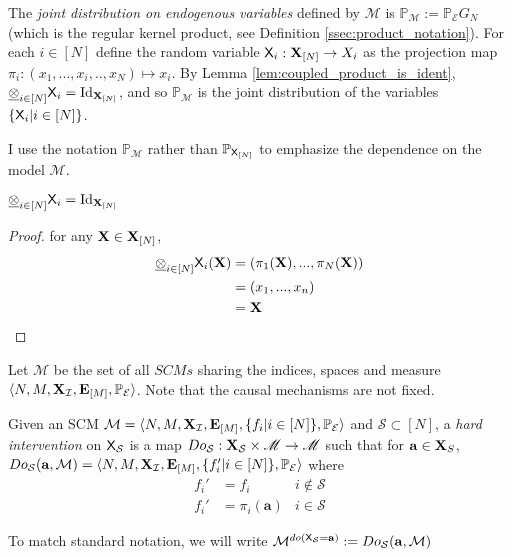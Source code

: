 \begin{definition}
The \emph{joint distribution on endogenous variables} defined by $\mathcal{M}$ is $\mathbb{P}_{\mathcal{M}}:=\mathbb{P}_\mathcal{E} G_N$ (which is the regular kernel product, see Definition \ref{ssec:product_notation}). For each $i\in[N]$ define the random variable $\mathsf{X}_i:\mathbf{X}_{[N]}\to X_i$ as the projection map $\pi_i:(x_1,...,x_i,..,x_N)\mapsto x_i$. By Lemma \ref{lem:coupled_product_is_ident}, $\underline{\otimes}_{i\in [N]} \mathsf{X}_i = \mathrm{Id}_{\mathbf{X}_{[N]}}$, and so $\mathbb{P}_{\mathcal{M}}$ is the joint distribution of the variables $\{\mathsf{X}_i|i\in[N]\}$.
\end{definition}

I use the notation $\mathbb{P}_{\mathcal{M}}$ rather than $\mathbb{P}_{\mathsf{X}_{[N]}}$ to emphasize the dependence on the model $\mathcal{M}$.

\begin{lemma}\label{lem:coupled_product_is_ident}
$\underline{\otimes}_{i\in [N]} \mathsf{X}_i = \mathrm{Id}_{\mathbf{X}_{[N]}}$
\end{lemma}

\begin{proof}
for any $\mathbf{X}\in \mathbf{X}_{[N]}$,
\begin{align}
\underline{\otimes}_{i\in [N]} \mathsf{X}_i (\mathbf{X}) &= (\pi_1(\mathbf{X}),...,\pi_N(\mathbf{X}))\\
    &= (x_1,...,x_n)\\
    &= \mathbf{X}
\end{align}
\end{proof}

\begin{definition}
Let $\mathscr{M}$ be the set of all $SCMs$ sharing the indices, spaces and measure $\langle N,M,\mathbf{X}_{\mathcal{I}},\mathbf{E}_{[M]},\mathbb{P}_{\mathcal{E}}\rangle$. Note that the causal mechanisms are not fixed.

Given an SCM $\mathcal{M}=\langle N,M,\mathbf{X}_{\mathcal{I}},\mathbf{E}_{[M]},\{f_i|i\in[N]\},\mathbb{P}_{\mathcal{E}}\rangle$ and $\mathcal{S}\subset[N]$, a \emph{hard intervention} on $\mathsf{X}_\mathcal{S}$ is a map $Do_{\mathcal{S}}:\mathbf{X}_\mathcal{S}\times\mathscr{M}\to \mathscr{M}$ such that for $\mathbf{a}\in \mathbf{X}_S$, $Do_{\mathcal{S}}(\mathbf{a},\mathcal{M}) = \langle N,M,\mathbf{X}_{\mathcal{I}},\mathbf{E}_{[M]},\{f'_i|i\in[N]\},\mathbb{P}_{\mathcal{E}}\rangle$ where
\begin{align}
    f_i' &= f_i  &i\not\in \mathcal{S}\\
    f_i' &= \pi_i(\mathbf{a}) & i\in \mathcal{S}
\end{align}

To match standard notation, we will write $\mathcal{M}^{do(\mathsf{X}_\mathcal{S} = \mathbf{a})}:=Do_{\mathcal{S}}(\mathbf{a},\mathcal{M})$
\end{definition}

